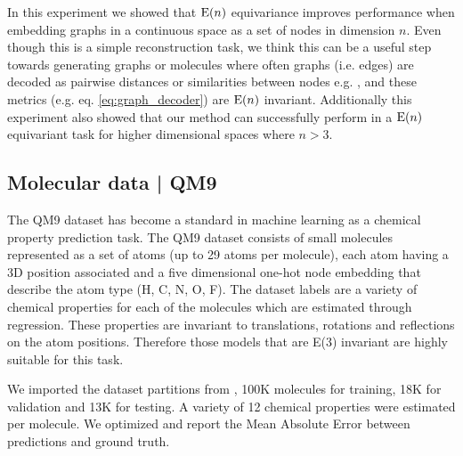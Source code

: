 In this experiment we showed that $\mathrm{E}(n)$ equivariance improves performance when embedding graphs in a continuous space as a set of nodes in dimension $n$. Even though this is a simple reconstruction task, we think this can be a useful step towards generating graphs or molecules where often graphs (i.e. edges) are decoded as pairwise distances or similarities between nodes e.g. \cite{kipf2016variational, liu2019graph, grover2019graphite}, and these metrics (e.g. eq. \ref{eq:graph_decoder}) are $\mathrm{E}(n)$ invariant. Additionally this experiment also showed that our method can successfully perform in a $\mathrm{E}(n)$ equivariant task for higher dimensional spaces where $n>3$.




\subsection{Molecular data | QM9}
The QM9 dataset \cite{ramakrishnan2014quantum} has become a standard in machine learning as a chemical property prediction task. The QM9 dataset consists of small molecules represented as a set of atoms (up to 29 atoms per molecule), each atom having a 3D position associated and a five dimensional one-hot node embedding that describe the atom type (H, C, N, O, F). The dataset labels are a variety of chemical properties for each of the molecules which are estimated through regression. These properties are invariant to translations, rotations and reflections on the atom positions.
Therefore those models that are E(3) invariant are highly suitable for this task. 

We imported the dataset partitions from \cite{anderson2019cormorant}, 100K molecules for training, 18K for validation and 13K for testing. A variety of 12 chemical properties were estimated per molecule. We optimized and report the Mean Absolute Error between predictions and ground truth.

